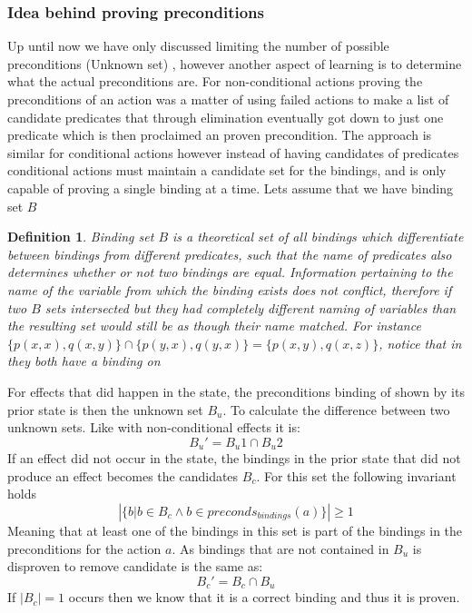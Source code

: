 \documentclass[../Master.tex]{subfiles}
\begin{document}
\subsubsection{Idea behind proving preconditions}
Up until now we have only discussed limiting the number of possible preconditions (Unknown set) , however another aspect of learning is to determine what the actual preconditions are. 
For non-conditional actions proving the preconditions of an action was a matter of using failed actions to make a list of candidate predicates that through elimination eventually got down to just one predicate which is then proclaimed an proven precondition. The approach is similar for conditional actions however instead of having candidates of predicates conditional actions must maintain a candidate set for the bindings, and is only capable of proving a single binding at a time. 
Lets assume that we have binding set $B$
\newtheorem{thm-binding-set}{Definition}
\begin{thm-binding-set}\label{thm:binding-set}
	Binding set $B$ is a theoretical set of all bindings which differentiate between bindings from different predicates, such that the name of predicates also determines whether or not two bindings are equal. Information pertaining to the name of the variable from which the binding exists does not conflict, therefore if two $B$ sets intersected but they had completely different naming of variables than the resulting set would still be as though their name matched.
	For instance $\{p(x,x), q(x,y)\} \cap \{p(y,x), q(y,x)\} = \{p(x,y), q(x,z)\}$, notice that in they both have a binding on 
\end{thm-binding-set}
For effects that did happen in the state, the preconditions binding of shown by its prior state is then the unknown set $B_u$.
To calculate the difference between two unknown sets. Like with non-conditional effects it is:
\begin{equation}
	B_u' = B_u1 \cap B_u2
\end{equation}
If an effect did not occur in the state, the bindings in the prior state that did not produce an effect becomes the candidates $B_c$. For this set the following invariant holds
\begin{equation}
\left| \{b  |  b \in B_c \land b \in preconds_{bindings}(a)\} \right|  \ge 1
\end{equation}
Meaning that at least one of the bindings in this set is part of the bindings in the preconditions for the action $a$. As bindings that are not contained in $B_u$ is disproven to remove candidate is the same as:
\begin{equation}
B_c' = B_c \cap B_u
\end{equation}
If $|B_c| = 1$ occurs then we know that it is a correct binding and thus it is proven.
\end{document}
